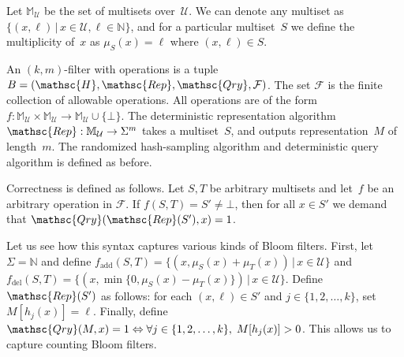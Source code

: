 Let $\mathbb{M}_\mathcal{U}$ be the set of multisets over~$\mathcal{U}$.  We can denote any multiset as $\{(x,\ell) \,|\, x \in \mathcal{U}, \ell \in \mathbb{N}\}$, and for a particular multiset~$S$ we define the multiplicity of~$x$ as $\mu_S(x) = \ell$ where $(x,\ell)\in S$.

An $(k,m)$-filter with operations is a tuple  $B=(\mathsc{H},\mathsc{Rep},\mathsc{Qry}, \mathcal{F})$.  
The set $\mathcal{F}$ is the finite collection of allowable operations.  All operations are of the form 
$f: \mathbb{M}_{\mathcal{U}} \times \mathbb{M}_{\mathcal{U}} \rightarrow \mathbb{M}_{\mathcal{U}} \cup \{\bot\}$.  
%
The deterministic representation algorithm $\mathsc{Rep}: \mathbb{M}_\mathcal{U} \rightarrow \Sigma^m$ takes a multiset~$S$, and outputs representation~$M$ of length~$m$.   The randomized hash-sampling algorithm and deterministic query algorithm is defined as before.

Correctness is defined as follows.  Let $S,T$ be arbitrary multisets and let~$f$ be an arbitrary operation in $\mathcal{F}$.  If $f(S,T) = S'\neq \bot$, then for all $x \in S'$ we demand that $\mathsc{Qry}(\mathsc{Rep}(S'),x)=1$.  

Let us see how this syntax captures various kinds of Bloom filters.  First, let $\Sigma = \mathbb{N}$ and define $f_{\mathrm{add}}(S,T)=\{(x,\mu_S(x)+\mu_T(x)) \,|\, x \in \mathcal{U}\}$ and $f_\mathrm{del}(S,T) = \{(x,\min\{0,\mu_S(x)-\mu_T(x)\}) \,|\, x \in \mathcal{U} \}$.  Define $\mathsc{Rep}(S')$ as follows: for each $(x,\ell)\in S'$ and $j\in\{1,2,\ldots,k\}$, set $M[h_j(x)]=\ell$.   Finally, define $\mathsc{Qry}(M,x) = 1 \Leftrightarrow \forall j \in \{1,2,\ldots,k\},\; M[h_j(x)] > 0$.  This allows us to capture counting Bloom filters.

